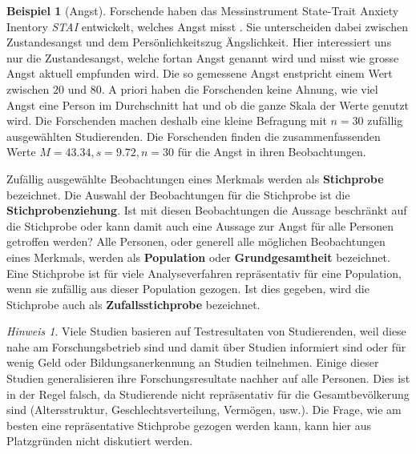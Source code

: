 \documentclass[
]{book}
\theoremstyle{definition}
\theoremstyle{definition}
\newtheorem{example}{Beispiel}[chapter]
\theoremstyle{definition}
\theoremstyle{definition}
\theoremstyle{remark}
\newtheorem*{remark}{Hinweis}
\begin{document}
\begin{example}[Angst]
\protect\hypertarget{exm:angst}{}\label{exm:angst}Forschende haben das Messinstrument State-Trait Anxiety Inentory \emph{STAI} entwickelt, welches Angst misst \citep{spielberger1983manual}. Sie unterscheiden dabei zwischen Zustandesangst und dem Persönlichkeitszug Ängslichkeit. Hier interessiert uns nur die Zustandesangst, welche fortan Angst genannt wird und misst wie grosse Angst aktuell empfunden wird. Die so gemessene Angst enstpricht einem Wert zwischen \(20\) und \(80\). A priori haben die Forschenden keine Ahnung, wie viel Angst eine Person im Durchschnitt hat und ob die ganze Skala der Werte genutzt wird. Die Forschenden machen deshalb eine kleine Befragung mit \(n =30\) zufällig ausgewählten Studierenden. Die Forschenden finden die zusammenfassenden Werte \(M=43.34, s = 9.72, n = 30\) für die Angst in ihren Beobachtungen.
\end{example}

\label{customdef-stichprobe}{Zufällig ausgewählte Beobachtungen eines Merkmals werden als \textbf{Stichprobe} bezeichnet.} \label{customdef-stichprobenziehung}{Die Auswahl der Beobachtungen für die Stichprobe ist die \textbf{Stichprobenziehung}.} Ist mit diesen Beobachtungen die Aussage beschränkt auf die Stichprobe oder kann damit auch eine Aussage zur Angst für alle Personen getroffen werden? \label{customdef-population}{Alle Personen, oder generell alle möglichen Beobachtungen eines Merkmals, werden als \textbf{Population}} \label{customdef-grundgesamtheit}{oder \textbf{Grundgesamtheit} bezeichnet}. \label{customdef-zufallsstichprobe}{Eine Stichprobe ist für viele Analyseverfahren repräsentativ für eine Population, wenn sie zufällig aus dieser Population gezogen. Ist dies gegeben, wird die Stichprobe auch als \textbf{Zufallsstichprobe} bezeichnet.}

\begin{remark}
Viele Studien basieren auf Testresultaten von Studierenden, weil diese nahe am Forschungsbetrieb sind und damit über Studien informiert sind oder für wenig Geld oder Bildungsanerkennung an Studien teilnehmen. Einige dieser Studien generalisieren ihre Forschungsresultate nachher auf alle Personen. Dies ist in der Regel falsch, da Studierende nicht repräsentativ für die Gesamtbevölkerung sind (Altersstruktur, Geschlechtsverteilung, Vermögen, usw.). Die Frage, wie am besten eine repräsentative Stichprobe gezogen werden kann, kann hier aus Platzgründen nicht diskutiert werden.
\end{remark}
\end{document}
